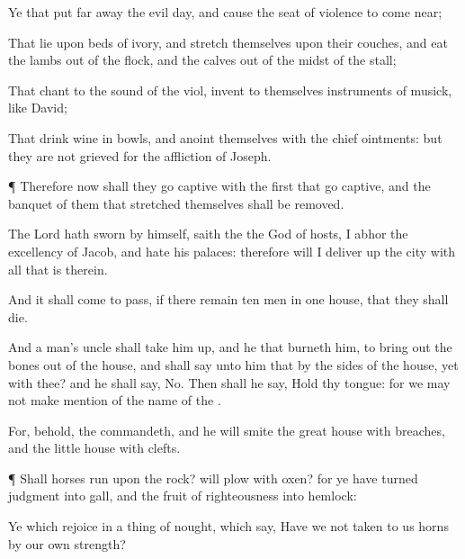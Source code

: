 {Ye that put far
away the
evil
day, and cause the
seat of
violence to come
near;

That
lie upon
beds of
ivory, and
stretch themselves upon their
couches, and
eat the
lambs out of the
flock, and the
calves out of the
midst of the
stall;

That
chant to the
sound of the
viol,
{}
invent to themselves
instruments of
musick, like
David;

That
drink
wine in
bowls, and
anoint themselves with the
chief
ointments: but they are not
grieved for the
affliction of
Joseph.


\par }{\PP {}¶ Therefore now shall they go
captive with the
first that go
captive, and the
banquet of them that
stretched themselves shall be
removed.


\par }{\PP {}The
Lord
{} hath
sworn by
himself,
saith the
{} the
God of
hosts, I
abhor the
excellency of
Jacob, and
hate his
palaces: therefore will I deliver
up the
city with all that is
therein.

And it shall come to pass, if there
remain
ten
men in
one
house, that they shall
die.

And a
man’s uncle shall take him
up, and he that
burneth him, to bring
out the
bones out of the
house, and shall
say unto him that
{} by the
sides of the
house,
{} yet
{} with thee? and he shall
say,
No. Then shall he
say, Hold thy
tongue: for we may not make
mention of the
name of the
{}.

For, behold, the
{}
commandeth, and he will
smite the
great
house with
breaches, and the
little
house with
clefts.


\par }{\PP {}¶ Shall
horses
run upon the
rock? will
{}
plow
{} with
oxen? for ye have
turned
judgment into
gall, and the
fruit of
righteousness into
hemlock:

Ye which
rejoice in a
thing of
nought, which
say, Have we not
taken to us
horns by our own
strength?

}
